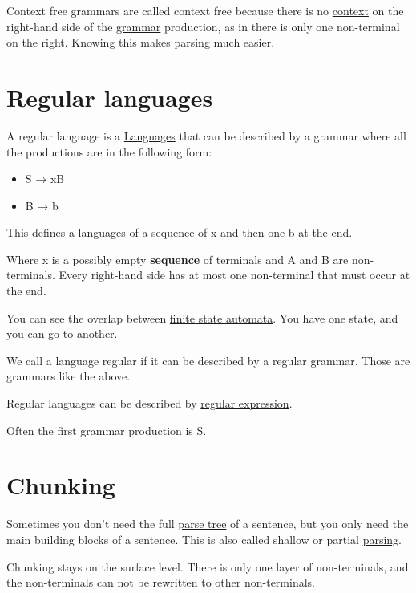 \documentclass[
  11pt,
  british,
]{article}
\providecommand{\tightlist}{%
  \setlength{\itemsep}{0pt}\setlength{\parskip}{0pt}}
\begin{document}
Context free grammars are called context free because there is no
\href{../Semantic-Similarity/Context.md}{context} on the right-hand side
of the \href{Grammar.md}{grammar} production, as in there is only one
non-terminal on the right. Knowing this makes parsing much easier.

\hypertarget{regular-languages}{%
\section{Regular languages}\label{regular-languages}}

A regular language is a \href{Languages/Languages.md}{Languages} that
can be described by a grammar where all the productions are in the
following form:

\begin{itemize}
\tightlist
\item
  S → xB
\item
  B → b
\end{itemize}

This defines a languages of a sequence of x and then one b at the end.

Where x is a possibly empty \textbf{sequence} of terminals and A and B
are non-terminals. Every right-hand side has at most one non-terminal
that must occur at the end.

You can see the overlap between
\href{finite\%20state\%20automata.md}{finite state automata}. You have
one state, and you can go to another.

We call a language regular if it can be described by a regular grammar.
Those are grammars like the above.

Regular languages can be described by
\href{Regular\%20expression.md}{regular expression}.

Often the first grammar production is S.

\hypertarget{chunking}{%
\section{Chunking}\label{chunking}}

Sometimes you don't need the full \href{Parse\%20Tree.md}{parse tree} of
a sentence, but you only need the main building blocks of a sentence.
This is also called shallow or partial \href{Parsing.md}{parsing}.

Chunking stays on the surface level. There is only one layer of
non-terminals, and the non-terminals can not be rewritten to other
non-terminals.
\end{document}
